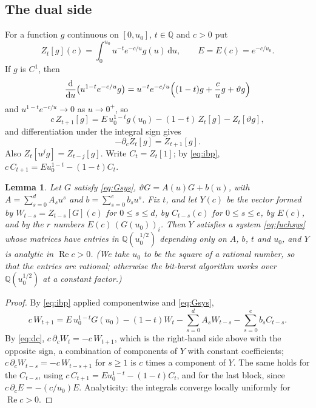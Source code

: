 \documentclass[11pt]{amsart}
\newtheorem{lemma}[theorem]{Lemma}
\theoremstyle{definition}
\theoremstyle{remark}
\newcommand{\dd}{\,\mathrm{d}}
\newcommand{\QQ}{\mathbb{Q}}
\begin{document}
\subsection{The dual side}\label{sec:dualgen}
For a function $g$ continuous on $[0, u_0]$, $t \in \QQ$ and $c > 0$ put
\[
  Z_t[g](c) = \int_0^{u_0} u^{-t} e^{-c/u} g(u)\dd u, \qquad E = E(c) = e^{-c/u_0}.
\]
If $g$ is $C^1$, then
\[
  \frac{\mathrm{d}}{\mathrm{d}u}\bigl(u^{1-t}e^{-c/u}g\bigr) = u^{-t}e^{-c/u}\Bigl((1-t)g + \frac cu g + \vartheta g\Bigr)
\]
and $u^{1-t}e^{-c/u} \to 0$ as $u \to 0^+$, so
\begin{equation}\label{eq:ibp}
  c\, Z_{t+1}[g] = E\, u_0^{1-t} g(u_0) - (1-t)\, Z_t[g] - Z_t[\vartheta g],
\end{equation}
and differentiation under the integral sign gives
\begin{equation}\label{eq:dc}
  -\partial_c Z_t[g] = Z_{t+1}[g].
\end{equation}
Also $Z_t[u^j g] = Z_{t-j}[g]$. Write $C_t = Z_t[1]$; by \eqref{eq:ibp},
$c\,C_{t+1} = E u_0^{1-t} - (1-t) C_t$.

\begin{lemma}\label{lem:moments}
Let $G$ satisfy \eqref{eq:Gsys}, $\vartheta G = A(u)G + b(u)$, with $A = \sum_{s=0}^{d} A_s u^s$ and
$b = \sum_{s=0}^{e} b_s u^s$. Fix $t$, and let $Y(c)$ be the vector formed by
$W_{t-s} = Z_{t-s}[G](c)$ for $0 \le s \le d$, by $C_{t-s}(c)$ for $0 \le s \le e$, by $E(c)$, and by the $r$ numbers
$E(c)\, (G(u_0))_i$. Then $Y$ satisfies a system \eqref{eq:fuchsys} whose matrices have entries in $\QQ(u_0^{1/2})$
depending only on $A$, $b$, $t$ and $u_0$, and $Y$ is analytic in $\operatorname{Re} c > 0$. (We take $u_0$ to be the
square of a rational number, so that the entries are rational; otherwise the bit-burst algorithm works over
$\QQ(u_0^{1/2})$ at a constant factor.)
\end{lemma}

\begin{proof}
By \eqref{eq:ibp} applied componentwise and \eqref{eq:Gsys},
\[
  c\, W_{t+1} = E\, u_0^{1-t} G(u_0) - (1-t) W_t - \sum_{s=0}^d A_s W_{t-s} - \sum_{s=0}^{e} b_s C_{t-s}.
\]
By \eqref{eq:dc}, $c\,\partial_c W_t = -c\,W_{t+1}$, which is the right-hand side above with the opposite sign,
a combination of components of $Y$ with constant coefficients; $c\,\partial_c W_{t-s} = -c\, W_{t-s+1}$ for
$s \ge 1$ is $c$ times a component of $Y$. The same holds for the $C_{t-s}$, using
$c\, C_{t+1} = E u_0^{1-t} - (1-t)C_t$, and for the last block, since $c\,\partial_c E = -(c/u_0)E$.
Analyticity: the integrals converge locally uniformly for $\operatorname{Re} c > 0$.
\end{proof}
\end{document}
